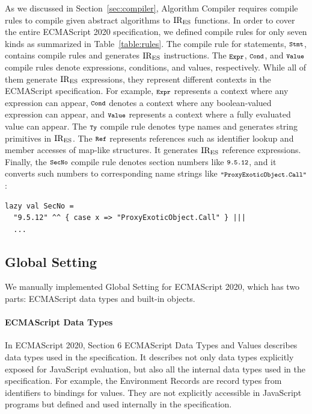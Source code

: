 As we discussed in Section~\ref{sec:compiler}, \textsf{Algorithm Compiler}
requires compile rules to compile given abstract algorithms to \( \text{IR}_\text{ES} \)
functions.  In order to cover the entire ECMAScript 2020 specification,
we defined compile rules for only seven kinds as summarized in
Table~\ref{table:rules}.  The compile rule for statements, \( \texttt{\footnotesize Stmt} \),
contains  compile rules and generates \( \text{IR}_\text{ES} \) instructions.
The \( \texttt{\footnotesize Expr} \), \( \texttt{\footnotesize Cond} \), and \( \texttt{\footnotesize Value} \) compile
rules denote expressions, conditions, and values, respectively.  While
all of them generate \( \text{IR}_\text{ES} \) expressions, they represent different
contexts in the ECMAScript specification.  For example,
\( \texttt{\footnotesize Expr} \) represents a context where any expression can appear,
\( \texttt{\footnotesize Cond} \) denotes a context where any boolean-valued expression
can appear, and \( \texttt{\footnotesize Value} \) represents a context where a fully
evaluated value can appear.  The \( \texttt{\footnotesize Ty} \) compile rule denotes
type names and generates string primitives in \( \text{IR}_\text{ES} \).  The \( \texttt{\footnotesize Ref} \)
represents references such as identifier lookup and member accesses of
map-like structures.  It generates \( \text{IR}_\text{ES} \) reference expressions.
Finally, the \( \texttt{\footnotesize SecNo} \) compile rule denotes section numbers
like \( \texttt{\footnotesize9.5.12} \), and it converts such numbers to
corresponding name strings like \( \texttt{\footnotesize"ProxyExoticObject.Call"} \):
\begin{lstlisting}[style=myScalastyle]
lazy val SecNo =
  "9.5.12" ^^ { case x => "ProxyExoticObject.Call" } |||
  ...
\end{lstlisting}

\subsection{Global Setting}
We manually implemented \textsf{Global Setting} for ECMAScript 2020,
which has two parts: ECMAScript data types and built-in objects.

\paragraph{ECMAScript Data Types}
In ECMAScript 2020, Section 6 \textsf{ECMAScript Data Types and Values}
describes data types used in the specification.  It describes not only
data types explicitly exposed for JavaScript evaluation, but also all
the internal data types used in the specification.  For example, the
Environment Records are record types from identifiers to bindings for
values.  They are not explicitly accessible in JavaScript programs
but defined and used internally in the specification.

